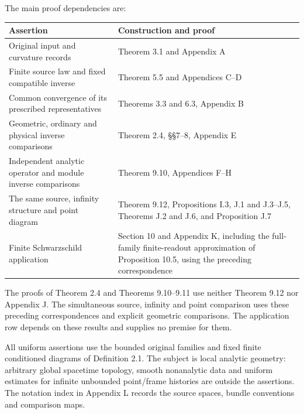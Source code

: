 \documentclass[
  english,
  11pt,
  reqno]{amsart}
\newcounter{none} %
\begin{document}
The main proof dependencies are:

{\def\LTcaptype{none} %
\begin{longtable}[]{@{}
  >{\raggedright\arraybackslash}p{}
  >{\raggedright\arraybackslash}p{}@{}}
\toprule\noalign{}
\begin{minipage}[b]{\linewidth}\raggedright
Assertion
\end{minipage} & \begin{minipage}[b]{\linewidth}\raggedright
Construction and proof
\end{minipage} \\
\midrule\noalign{}
\endhead
\bottomrule\noalign{}
\endlastfoot
Original input and curvature records & Theorem 3.1 and Appendix A \\
Finite source law and fixed compatible inverse & Theorem 5.5 and
Appendices C--D \\
Common convergence of its prescribed representatives & Theorems 3.3 and
6.3, Appendix B \\
Geometric, ordinary and physical inverse comparisons & Theorem 2.4,
§§7--8, Appendix E \\
Independent analytic operator and module inverse comparisons & Theorem
9.10, Appendices F--H \\
The same source, infinity structure and point diagram & Theorem 9.12,
Propositions I.3, J.1 and J.3--J.5, Theorems J.2 and J.6, and
Proposition J.7 \\
Finite Schwarzschild application & Section 10 and Appendix K, including
the full-family finite-readout approximation of Proposition 10.5, using
the preceding correspondence \\
\end{longtable}
}

The proofs of Theorem 2.4 and Theorems 9.10--9.11 use neither Theorem
9.12 nor Appendix J. The simultaneous source, infinity and point
comparison uses these preceding correspondences and explicit geometric
comparisons. The application row depends on these results and supplies
no premise for them.

All uniform assertions use the bounded original families and fixed
finite conditioned diagrams of Definition 2.1. The subject is local
analytic geometry: arbitrary global spacetime topology, smooth
nonanalytic data and uniform estimates for infinite unbounded
point/frame histories are outside the assertions. The notation index in
Appendix L records the source spaces, bundle conventions and comparison
maps.
\end{document}
